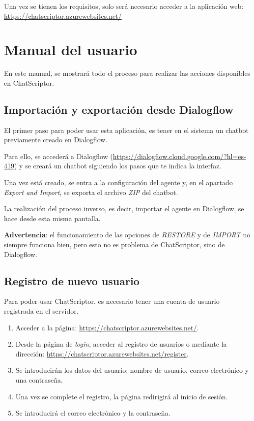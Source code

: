 Una vez se tienen los requisitos, solo será necesario acceder a la aplicación web: \url{https://chatscriptor.azurewebsites.net/}

\section{Manual del usuario}
En este manual, se mostrará todo el proceso para realizar las acciones disponibles en ChatScriptor.

\subsection{Importación y exportación desde Dialogflow}
El primer paso para poder usar esta aplicación, es tener en el sistema un chatbot previamente creado en Dialogflow.

Para ello, se accederá a Dialogflow (\url{https://dialogflow.cloud.google.com/?hl=es-419}) y se creará un chatbot siguiendo los pasos que te indica la interfaz.

Una vez está creado, se entra a la configuración del agente y, en el apartado \textit{Export and Import}, se exporta el archivo \textit{ZIP} del chatbot.

La realización del proceso inverso, es decir, importar el agente en Dialogflow, se hace desde esta misma pantalla.

\textbf{Advertencia}: el funcionamiento de las opciones de \textit{RESTORE} y de \textit{IMPORT} no siempre funciona bien, pero esto no es problema de ChatScriptor, sino de Dialogflow.

\subsection{Registro de nuevo usuario}
Para poder usar ChatScriptor, es necesario tener una cuenta de usuario registrada en el servidor.

\begin{enumerate}
    \item Acceder a la página: \url{https://chatscriptor.azurewebsites.net/}.
    \item Desde la página de \textit{login}, acceder al registro de usuarios o mediante la dirección: \url{https://chatscriptor.azurewebsites.net/register}.
    \item Se introducirán los datos del usuario: nombre de usuario, correo electrónico y una contraseña.
    \item Una vez se complete el registro, la página redirigirá al inicio de sesión.
    \item Se introducirá el correo electrónico y la contraseña.
\end{enumerate}

